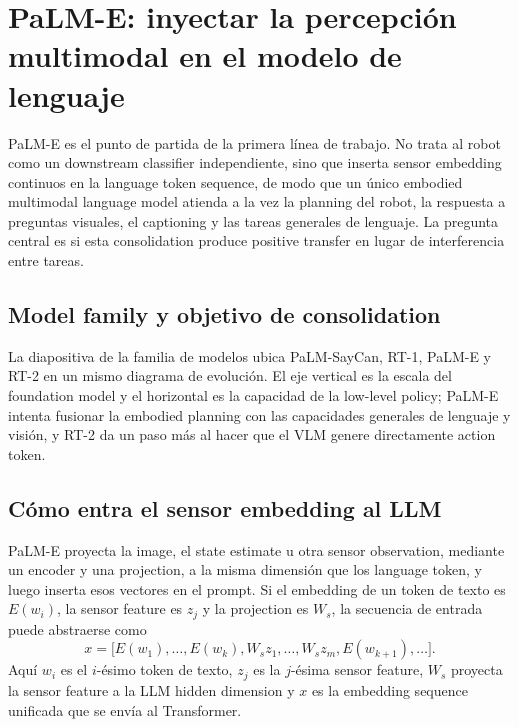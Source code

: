 \section{PaLM-E: inyectar la percepción multimodal en el modelo de lenguaje}

PaLM-E es el punto de partida de la primera línea de trabajo. No trata al robot como un downstream classifier independiente, sino que inserta sensor embedding continuos en la language token sequence, de modo que un único embodied multimodal language model atienda a la vez la planning del robot, la respuesta a preguntas visuales, el captioning y las tareas generales de lenguaje. La pregunta central es si esta consolidation produce positive transfer en lugar de interferencia entre tareas.

\subsection{Model family y objetivo de consolidation}

La diapositiva de la familia de modelos ubica PaLM-SayCan, RT-1, PaLM-E y RT-2 en un mismo diagrama de evolución. El eje vertical es la escala del foundation model y el horizontal es la capacidad de la low-level policy; PaLM-E intenta fusionar la embodied planning con las capacidades generales de lenguaje y visión, y RT-2 da un paso más al hacer que el VLM genere directamente action token.



\subsection{Cómo entra el sensor embedding al LLM}

PaLM-E proyecta la image, el state estimate u otra sensor observation, mediante un encoder y una projection, a la misma dimensión que los language token, y luego inserta esos vectores en el prompt. Si el embedding de un token de texto es $E(w_i)$, la sensor feature es $z_j$ y la projection es $W_s$, la secuencia de entrada puede abstraerse como
$$
x=\big[E(w_1),\ldots,E(w_k),W_sz_1,\ldots,W_sz_m,E(w_{k+1}),\ldots\big].
$$
Aquí $w_i$ es el $i$-ésimo token de texto, $z_j$ es la $j$-ésima sensor feature, $W_s$ proyecta la sensor feature a la LLM hidden dimension y $x$ es la embedding sequence unificada que se envía al Transformer.

